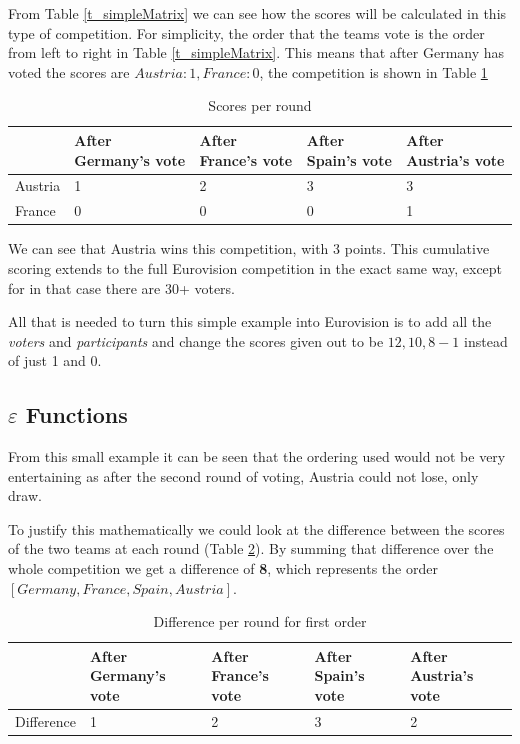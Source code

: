 \documentclass[12pt]{report}
\begin{document}
From Table \ref{t_simpleMatrix} we can see how the scores will be calculated in this type of competition. For simplicity, the order that the teams vote is the order from left to right in Table \ref{t_simpleMatrix}. This means that after Germany has voted the scores are $Austria: 1, France: 0$, the competition is shown in Table \ref{t_simpleScores}

\begin{table}[H]
\centering
\caption{Scores per round}
\label{t_simpleScores}
\begin{tabular}{|l|l|l|l|l|}
\hline
        & After Germany's vote & After France's vote & After Spain's vote & After Austria's vote \\ \hline
Austria & 1                    & 2                  & 3                   & 3                    \\ \hline
France  & 0                    & 0                  & 0                   & 1                    \\ \hline
\end{tabular}
\end{table}

We can see that Austria wins this competition, with 3 points. This cumulative scoring extends to the full Eurovision competition in the exact same way, except for in that case there are 30+ voters.

All that is needed to turn this simple example into Eurovision is to add all the \textit{voters} and \textit{participants} and change the scores given out to be $12, 10, 8-1$ instead of just 1 and 0.

\subsection{$\varepsilon$ Functions}\label{EntertainmentFunction}
From this small example it can be seen that the ordering used would not be very entertaining as after the second round of voting, Austria could not lose, only draw. 

To justify this mathematically we could look at the difference between the scores of the two teams at each round (Table \ref{t_simpleDifferences}). By summing that difference over the whole competition we get a difference of \textbf{8}, which represents the order $[Germany, France, Spain, Austria]$. 

\begin{table}[H]
\centering
\caption{Difference per round for first order}
\label{t_simpleDifferences}
\begin{tabular}{|l|l|l|l|l|}
\hline
        & After Germany's vote & After France's vote & After Spain's vote & After Austria's vote \\ \hline
Difference & 1                    & 2                  & 3                   & 2                    \\ \hline
\end{tabular}
\end{table}
\end{document}
